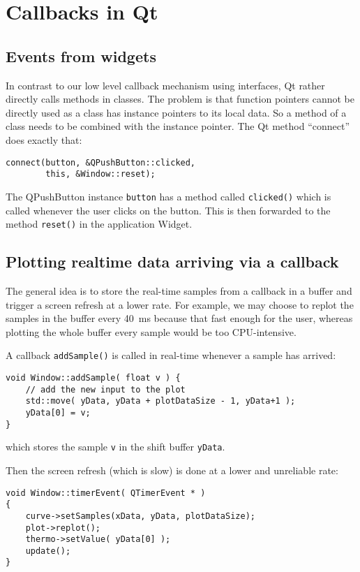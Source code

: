 \documentclass[12pt]{report}
\begin{document}
\section{Callbacks in Qt}
\subsection{Events from widgets}
In contrast to our low level callback mechanism using interfaces, Qt rather
directly calls methods in classes. The problem is that function pointers
cannot be directly used as a class has instance pointers to its local
data. So a method of a class needs to be combined with the instance
pointer. The Qt method ``connect'' does exactly that:
\begin{verbatim}
connect(button, &QPushButton::clicked,
        this, &Window::reset);
\end{verbatim}
The QPushButton instance \texttt{button} has a method called \texttt{clicked()} which is
called whenever the user clicks on the button. This is then forwarded to the
method \texttt{reset()} in the application Widget.


\subsection{Plotting realtime data arriving via a callback}
The general idea is to store the real-time samples from a callback in a
buffer and trigger a screen refresh at a lower rate. For example, we may
choose to replot the samples in the buffer every
40~ms because that fast enough for the user, whereas plotting the
whole buffer every sample would be too CPU-intensive.

A callback \texttt{addSample()} is called in real-time whenever
a sample has arrived:
\begin{verbatim}
void Window::addSample( float v ) {
    // add the new input to the plot
    std::move( yData, yData + plotDataSize - 1, yData+1 );
    yData[0] = v;
}
\end{verbatim}
which stores the sample \texttt{v} in the shift buffer \texttt{yData}.

Then the screen refresh (which is slow) is done at
a lower and unreliable rate:
\begin{verbatim}
void Window::timerEvent( QTimerEvent * )
{
    curve->setSamples(xData, yData, plotDataSize);
    plot->replot();
    thermo->setValue( yData[0] );
    update();
}
\end{verbatim}
\end{document}
